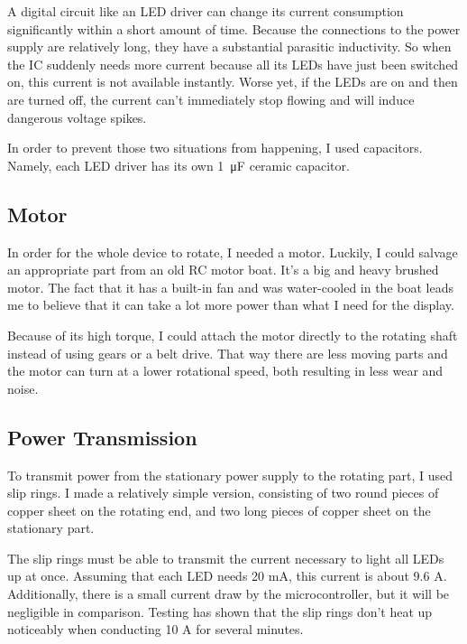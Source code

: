 \documentclass[a4paper, 11pt, titlepage]{report}
\begin{document}
A digital circuit like an LED driver can change its current consumption significantly within a
short amount of time. Because the connections to the power supply are relatively long, they have
a substantial parasitic inductivity. So when the IC suddenly needs more current because all its
LEDs have just been switched on, this current is not available instantly. Worse yet, if the LEDs
are on and then are turned off, the current can't immediately stop flowing and will induce
dangerous voltage spikes.

In order to prevent those two situations from happening, I used capacitors. Namely, each LED
driver has its own \SI{1}{\micro\farad}  ceramic capacitor.



\subsection{Motor}

In order for the whole device to rotate, I needed a motor. Luckily, I could salvage an appropriate
part from an old RC motor boat. It's a big and heavy brushed motor. The fact that it has a
built-in fan and was water-cooled in the boat leads me to believe that it can take a lot more
power than what I need for the display.

Because of its high torque, I could attach the motor directly to the rotating shaft instead of
using gears or a belt drive. That way there are less moving parts and the motor can turn at a
lower rotational speed, both resulting in less wear and noise.



\subsection{Power Transmission}

To transmit power from the stationary power supply to the rotating part, I used slip rings. I made
a relatively simple version, consisting of two round pieces of copper sheet on the rotating end,
and two long pieces of copper sheet on the stationary part.

The slip rings must be able to transmit the current necessary to light all LEDs up at once.
Assuming that each LED needs 20 mA, this current is about 9.6 A. Additionally, there is a small
current draw by the microcontroller, but it will be negligible in comparison. Testing has shown
that the slip rings don't heat up noticeably when conducting 10 A for several minutes.
\end{document}

